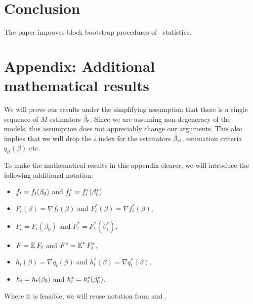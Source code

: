 \documentclass[12pt,fleqn]{article}
\begin{document}
\section{Conclusion}\label{sec:4}
The paper improves block bootstrap procedures of \oos\
statistics.

\appendix
\section*{Appendix: Additional mathematical results}\label{sec:B}
\renewcommand{\thesubsection}{\Alph{subsection}}

We will prove our results under the simplifying assumption that there
is a single sequence of $M$-estimators $\hat \beta_t$. Since we are assuming
non-degeneracy of the models, this assumption does not appreciably
change our arguments. This also implies that we will drop the $i$
index for the estimators $\hat \beta_{it}$, estimation criteria
$q_{it}(\beta)$ etc.

To make the mathematical results in this appendix clearer, we will
introduce the following additional notation:
\begin{itemize}
\item $f_t = f_t(\beta_0)$ and $f_t^* = f_t^*(\beta_0^*)$
\item $F_t(\beta) = \nabla f_t(\beta)$ and $F_t^*(\beta) = \nabla
  f_t^*(\beta)$,
\item $F_t = F_t(\beta_0)$ and $F_t^* = F_t^*(\beta_1^*)$,
\item $F = \operatorname{E} F_t$ and $F^* = \operatorname{E}^* F_t^*$,
\item $h_t(\beta) = \nabla q_t(\beta)$ and $h_t^*(\beta) = \nabla q_t^*(\beta)$,
\item $h_t = h_t(\beta_0)$ and $h_t^* = h_t^*(\beta_0^*)$.
\end{itemize}
Where it is feasible, we will reuse notation from \cite{Wes:96} and
\cite{WeM:98}.
\end{document}
